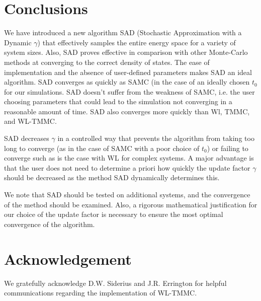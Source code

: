 \documentclass[letterpaper,twocolumn,amsmath,amssymb,pre,aps,10pt]{revtex4-1}
\newcommand{\blue}[1]{{\bf \color{blue} #1}}
\newcommand{\jpsays}[1]{{\color{red} [\blue{Jordan:} \emph{#1}]}}
\begin{document}
\section{Conclusions}

We have introduced a new algorithm SAD (Stochastic Approximation with a
Dynamic $\gamma$) that effectively samples the entire energy space for
a variety of system sizes.  Also, SAD proves effective in comparison
with other Monte-Carlo methods at converging to the correct density of
states.  The ease of implementation and the absence of user-defined
parameters makes SAD an ideal algorithm. SAD converges as quickly as
SAMC (in the case of an ideally chosen $t_0$ for our simulations. SAD
doesn't suffer from the weakness of SAMC, i.e. the user choosing
parameters that could lead to the simulation not converging in a
reasonable amount of time. SAD also converges more quickly than Wl,
TMMC, and WL-TMMC.

SAD decreases $\gamma$ in a controlled way that prevents the algorithm
from taking too long to converge (as in the case of SAMC with a poor choice
of $t_0$) or failing to converge such as is the case with WL for complex
systems. A major advantage is that the user does not need to determine a
priori how quickly the update factor $\gamma$ should be decreased as the
method SAD dynamically determines this.

We note that SAD should be tested on additional systems, and the
convergence of the method should be examined.  Also, a rigorous
mathematical justification for our choice of the update factor is
necessary to ensure the most optimal convergence of the algorithm.

\section{Acknowledgement}

We gratefully acknowledge D.W. Siderius and
J.R. Errington for helpful communications regarding the implementation
of WL-TMMC.


\end{document}
